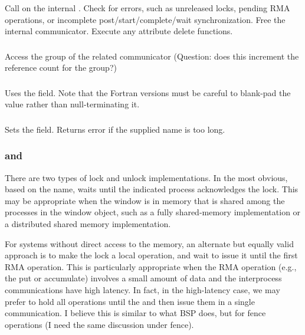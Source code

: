 \documentclass{article}
\begin{document}
\subsubsection{}
Call  on the internal .
Check for errors, such as unreleased locks, pending RMA operations, or
incomplete 
post/start/complete/wait synchronization.
Free the internal communicator.  Execute any attribute delete functions.

\subsubsection{}
Access the group of the related communicator (Question: does this increment the
reference count for the group?)

\subsubsection{}
Uses the  field.  Note that the Fortran versions
must be careful to blank-pad the value rather than null-terminating it.

\subsubsection{}
Sets the  field.  Returns error if the supplied name
is too long. 

\subsubsection{ and }
There are two types of lock and unlock implementations.  In the most
obvious, based on the name,  waits until the
indicated process acknowledges the lock. This may be appropriate when the
window is in memory that is shared among the processes in the window
object, such as a fully shared-memory implementation or a distributed
shared memory implementation.

For systems without direct access to the memory, an alternate but
equally valid approach is to make the lock a local operation, and wait
to issue it until the first RMA operation.  This is particularly
appropriate when the RMA operation (e.g., the put or accumulate)
involves a small amount of data and the interprocess communications
have high latency.  In fact, in the high-latency case, we may prefer
to hold all operations until the  and then issue
them in a single communication.  I believe this is similar to what BSP
does, but for fence operations (I need the same discussion under fence).
\end{document}
